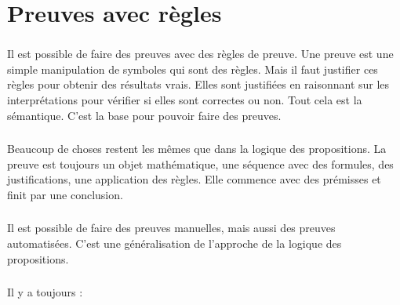 
\section{Preuves avec règles}

\subsubsection{}
    Il est possible de faire des preuves avec des règles de preuve. Une preuve est une simple manipulation de symboles qui sont des règles. Mais il faut justifier ces règles pour obtenir des résultats vrais. Elles sont justifiées en raisonnant sur les interprétations pour vérifier si elles sont correctes ou non. Tout cela est la sémantique. C'est la base pour pouvoir faire des preuves.
 \subsubsection{}
    
Beaucoup de choses restent les mêmes que dans la logique des propositions. La preuve est toujours un objet mathématique, une séquence avec des formules, des justifications, une application des règles. Elle commence avec des prémisses et finit par une conclusion.

\subsubsection{}
Il est possible de faire des preuves manuelles, mais aussi des preuves automatisées. C'est une généralisation de l'approche de la logique des propositions. 
\subsubsection{}

Il y a toujours :

